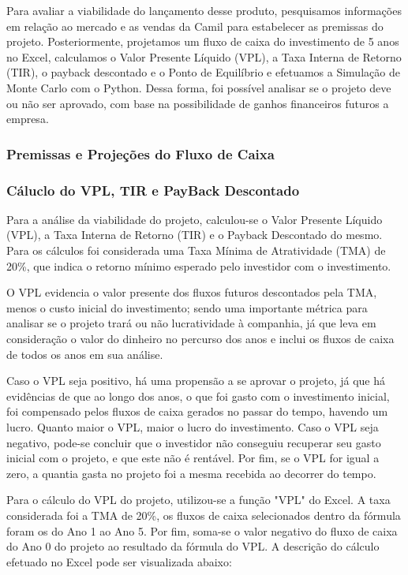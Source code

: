 \documentclass[11pt]{article}
\begin{document}
Para avaliar a viabilidade do lançamento desse produto, pesquisamos informações em relação ao mercado e as vendas da Camil para estabelecer as premissas do projeto. Posteriormente, projetamos um fluxo de caixa do investimento de 5 anos no Excel, calculamos o Valor Presente Líquido (VPL), a Taxa Interna de Retorno (TIR), o payback descontado e o Ponto de Equilíbrio e efetuamos a Simulação de Monte Carlo com o Python. Dessa forma, foi possível analisar se o projeto deve ou não ser aprovado, com base na possibilidade de ganhos financeiros futuros a empresa.

\subsubsection{\textbf{Premissas e Projeções do Fluxo de Caixa}}
\subsubsection{\textbf{Cáluclo do VPL, TIR e PayBack Descontado}}
Para a análise da viabilidade do projeto, calculou-se o Valor Presente Líquido (VPL), a Taxa Interna de Retorno (TIR) e o Payback Descontado do mesmo. Para os cálculos foi considerada uma Taxa Mínima de Atratividade (TMA) de 20\%, que indica o retorno mínimo esperado pelo investidor com o investimento. 

O VPL evidencia o valor presente dos fluxos futuros descontados pela TMA, menos o custo inicial do investimento; sendo uma importante métrica para analisar se o projeto trará ou não lucratividade à companhia, já que leva em consideração o valor do dinheiro no percurso dos anos e inclui os fluxos de caixa de todos os anos em sua análise. 

Caso o VPL seja positivo, há uma propensão a se aprovar o projeto, já que há evidências de que ao longo dos anos, o que foi gasto com o investimento inicial, foi compensado pelos fluxos de caixa gerados no passar do tempo, havendo um lucro. Quanto maior o VPL, maior o lucro do investimento. Caso o VPL seja negativo, pode-se concluir que o investidor não conseguiu recuperar seu gasto inicial com o projeto, e que este não é rentável. Por fim, se o VPL for igual a zero, a quantia gasta no projeto foi a mesma recebida ao decorrer do tempo. 

Para o cálculo do VPL do projeto, utilizou-se a função "VPL" do Excel. A taxa considerada foi a TMA de 20\%, os fluxos de caixa selecionados dentro da fórmula foram os do Ano 1 ao Ano 5. Por fim, soma-se o valor negativo do fluxo de caixa do Ano 0 do projeto ao resultado da fórmula do VPL. A descrição do cálculo efetuado no Excel pode ser visualizada abaixo:
\end{document}
